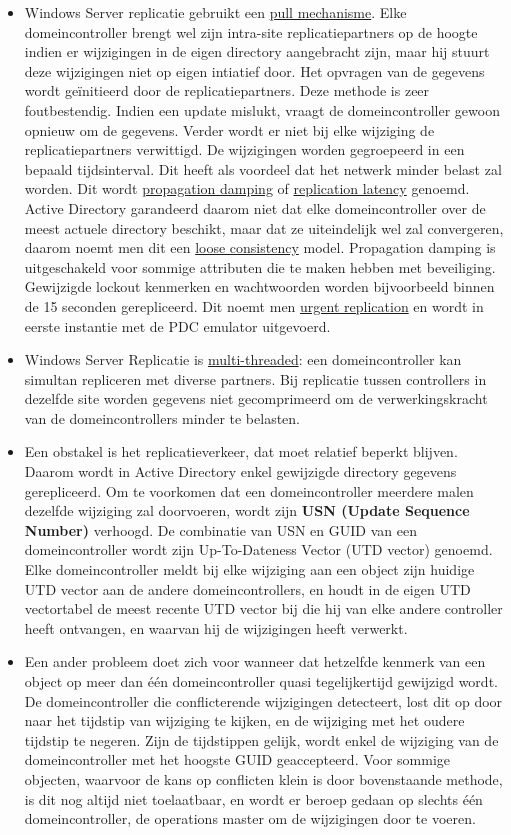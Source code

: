 \documentclass{report}
\begin{document}
\begin{enumerate}
{\begin{itemize}
				\item Windows Server replicatie gebruikt een \underline{pull mechanisme}.  Elke domeincontroller brengt wel zijn intra-site replicatiepartners op de hoogte indien er wijzigingen in de eigen directory aangebracht zijn, maar hij stuurt deze wijzigingen niet op eigen intiatief door. Het opvragen van de gegevens wordt geïnitieerd door de replicatiepartners. Deze methode is zeer foutbestendig. Indien een update mislukt, vraagt de domeincontroller gewoon opnieuw om de gegevens. Verder wordt er niet bij elke wijziging de replicatiepartners verwittigd. De wijzigingen worden gegroepeerd in een bepaald tijdsinterval. Dit heeft als voordeel dat het netwerk minder belast zal worden. Dit wordt \underline{propagation damping} of \underline{replication latency} genoemd. Active Directory garandeerd daarom niet dat elke domeincontroller over de meest actuele directory beschikt, maar dat ze uiteindelijk wel zal convergeren, daarom noemt men dit een \underline{loose consistency} model. Propagation damping is uitgeschakeld voor sommige attributen die te maken hebben met beveiliging. Gewijzigde lockout kenmerken en wachtwoorden worden bijvoorbeeld binnen de 15 seconden gerepliceerd. Dit noemt men \underline{urgent replication} en wordt in eerste instantie met de PDC emulator uitgevoerd. 
				\item Windows Server Replicatie is \underline{multi-threaded}: een domeincontroller kan simultan repliceren met diverse partners. Bij replicatie tussen controllers in dezelfde site worden gegevens niet gecomprimeerd om de verwerkingskracht van de domeincontrollers minder te belasten. 
				\item Een obstakel is het replicatieverkeer, dat moet relatief beperkt blijven. Daarom wordt in Active Directory enkel gewijzigde directory gegevens gerepliceerd. Om te voorkomen dat een domeincontroller meerdere malen dezelfde wijziging zal doorvoeren, wordt zijn \textbf{USN (Update Sequence Number)} verhoogd. De combinatie van USN en GUID van een domeincontroller wordt zijn Up-To-Dateness Vector (UTD vector) genoemd. Elke domeincontroller meldt bij elke wijziging aan een object zijn huidige UTD vector aan de andere domeincontrollers, en houdt in de eigen UTD vectortabel de meest recente UTD vector bij die hij van elke andere controller heeft ontvangen, en waarvan hij de wijzigingen heeft verwerkt.
				\item Een ander probleem doet zich voor wanneer dat hetzelfde kenmerk van een object op meer dan één domeincontroller quasi tegelijkertijd gewijzigd wordt. De domeincontroller die conflicterende wijzigingen detecteert, lost dit op door naar het tijdstip van wijziging te kijken, en de wijziging met het oudere tijdstip te negeren. Zijn de tijdstippen gelijk, wordt enkel de wijziging van de domeincontroller met het hoogste GUID geaccepteerd. Voor sommige objecten, waarvoor de kans op conflicten klein is door bovenstaande methode, is dit nog altijd niet toelaatbaar, en wordt er beroep gedaan op slechts één domeincontroller, de operations master om de wijzigingen door te voeren.

\end{itemize}}
\end{enumerate}
\end{document}
